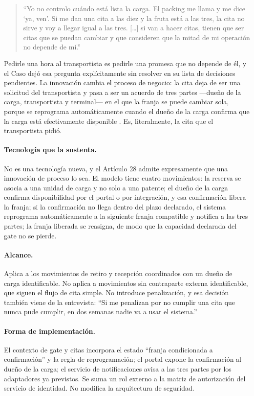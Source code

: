 \begin{quote}
\small
\enquote{Yo no controlo cuándo está lista la carga. El packing me llama y me
dice \enquote{ya, ven}. Si me dan una cita a las diez y la fruta está a las
tres, la cita no sirve y voy a llegar igual a las tres. [\dots] si van a hacer
citas, tienen que ser citas que se puedan cambiar y que consideren que la mitad
de mi operación no depende de mí.}
\end{quote}

Pedirle una hora al transportista es pedirle una promesa que no depende de él,
y el Caso dejó esa pregunta explícitamente sin resolver en su lista de
decisiones pendientes. La innovación cambia el proceso de negocio: la cita deja
de ser una solicitud del transportista y pasa a ser un acuerdo de tres partes
—dueño de la carga, transportista y terminal— en el que la franja se puede
cambiar sola, porque se reprograma automáticamente cuando el dueño de la carga
confirma que la carga está efectivamente disponible \Propuesta. Es, literalmente,
la cita que el transportista pidió.

\paragraph*{Tecnología que la sustenta.}
No es una tecnología nueva, y el Artículo 28\textdegree{} admite expresamente
que una innovación de proceso lo sea. El modelo tiene cuatro movimientos: la
reserva se asocia a una unidad de carga y no solo a una patente; el dueño de la
carga confirma disponibilidad por el portal o por integración, y esa
confirmación libera la franja; si la confirmación no llega dentro del plazo
declarado, el sistema reprograma automáticamente a la siguiente franja
compatible y notifica a las tres partes; la franja liberada se reasigna, de
modo que la capacidad declarada del gate no se pierde.

\paragraph*{Alcance.}
Aplica a los movimientos de retiro y recepción coordinados con un dueño de
carga identificable. No aplica a movimientos sin contraparte externa
identificable, que siguen el flujo de cita simple. No introduce penalización, y
esa decisión también viene de la entrevista: \enquote{Si me penalizan por no
cumplir una cita que nunca pude cumplir, en dos semanas nadie va a usar el
sistema.}

\paragraph*{Forma de implementación.}
El contexto de gate y citas incorpora el estado \enquote{franja condicionada a
confirmación} y la regla de reprogramación; el portal expone la confirmación al
dueño de la carga; el servicio de notificaciones avisa a las tres partes por
los adaptadores ya previstos. Se suma un rol externo a la matriz de
autorización del servicio de identidad. No modifica la arquitectura de
seguridad.

